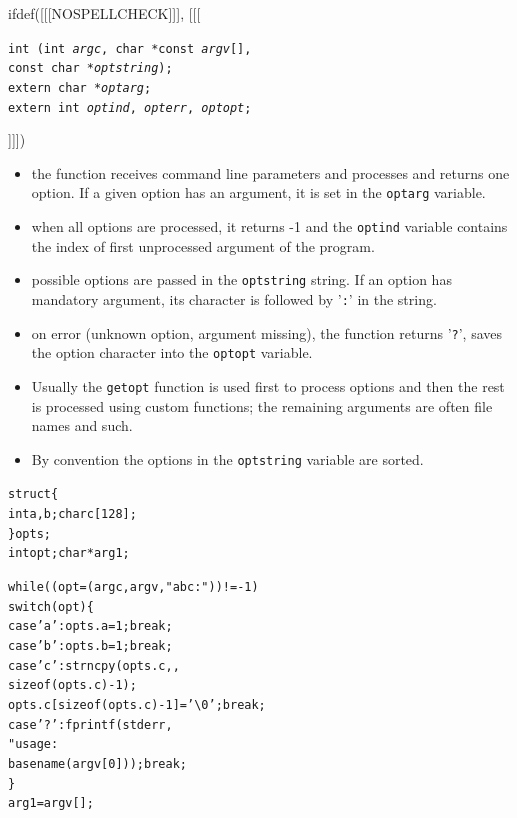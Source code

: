 \begin{slide}
\setlength{\baselineskip}{0.8\baselineskip}
ifdef([[[NOSPELLCHECK]]], [[[
\begin{tabbing}
\texttt{int (}\=\texttt{int \emph{argc},
char *const \emph{argv}[],}\\
\>\texttt{const char *\emph{optstring});}\\
\texttt{extern char *\emph{optarg};}\\
\texttt{extern int \emph{optind}, \emph{opterr}, \emph{optopt};} 
\end{tabbing}
]]])
\begin{itemize}
\item the function receives command line parameters and processes and returns
one option. If a given option has an argument, it is set in the
\texttt{optarg} variable.
\item when all options are processed, it returns -1 and the \texttt{optind} 
variable contains the index of first unprocessed argument of the program.
\item possible options are passed in the \texttt{optstring} string.
If an option has mandatory argument, its character is followed by '\texttt{:}'
in the string.
\item on error (unknown option, argument missing), the function returns
'\texttt{?}', saves the option character into the \texttt{optopt} variable.
\end{itemize}
\end{slide}

\begin{itemize}
\item Usually the \texttt{getopt} function is used first to process options
and then the rest is processed using custom functions; the remaining arguments
are often file names and such.
\item By convention the options in the \texttt{optstring} variable are sorted.
\end{itemize}


\begin{slide}
\setlength{\baselineskip}{0.8\baselineskip}
\begin{alltt}
struct \{
    int a, b; char c[128]; 
\} opts; 
int opt; char *arg1; 

while((opt = (argc, argv, "abc:")) != -1) 
    switch(opt) \{ 
        case 'a': opts.a = 1; break; 
        case 'b': opts.b = 1; break; 
        case 'c': strncpy(opts.c, ,
            sizeof (opts.c) - 1);
            opts.c[sizeof (opts.c) - 1] = '\textbackslash0'; break; 
        case '?': fprintf(stderr, 
            "usage: %
            basename(argv[0])); break; 
    \} 
arg1 = argv[];
\end{alltt}
\end{slide}

